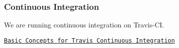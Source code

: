 \subsubsection*{Continuous Integration}

We are running continuous integration on Travis-\/\+CI.

\href{https://docs.travis-ci.com/user/for-beginners/}{\tt Basic Concepts for Travis Continuous Integration} 